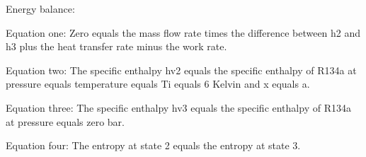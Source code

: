 Energy balance:

Equation one: Zero equals the mass flow rate times the difference between h2 and h3 plus the heat transfer rate minus the work rate.

Equation two: The specific enthalpy hv2 equals the specific enthalpy of R134a at pressure equals temperature equals Ti equals 6 Kelvin and x equals a.

Equation three: The specific enthalpy hv3 equals the specific enthalpy of R134a at pressure equals zero bar.

Equation four: The entropy at state 2 equals the entropy at state 3.